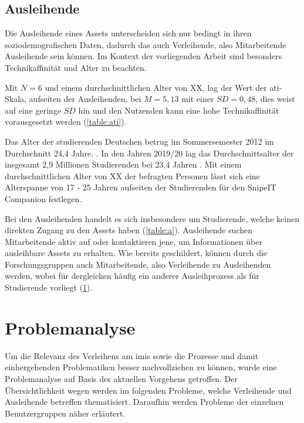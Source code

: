 \subsection{Ausleihende}
Die Ausleihende eines Assets unterscheiden sich nur bedingt in ihren soziodemografischen Daten,
dadurch das auch Verleihende, also Mitarbeitende Ausleihende sein können. Im Kontext der
vorliegenden Arbeit sind besonders Technikaffinität und Alter zu beachten.

Mit $N=6$ und einem durchschnittlichen Alter von XX, lag der Wert der \ac{ati}-Skala, aufseiten der
Ausleihenden, bei $M=5,13$ mit einer $SD=0,48$, dies weist auf eine geringe $SD$ hin und den
Nutzenden kann eine hohe Technikaffinität vorausgesetzt werden  (\ref{table:ati}).

Das Alter der studierenden Deutschen betrug im Sommersemester 2012 im Durchschnitt 24,4
Jahre. \cite{middendorff2017wirtschaftliche}. In den Jahren 2019/20 lag das Durchschnittsalter der
insgesamt 2,9 Millionen Studierenden bei 23,4 Jahren \cite{noauthor_studierende_nodate}. Mit einem
durchschnittlichen Alter von XX der befragten Personen lässt sich eine Alterspanne von 17 - 25
Jahren aufseiten der Studierenden für den SnipeIT Companion festlegen.

Bei den Ausleihenden handelt es sich insbesondere um Studierende, welche keinen direkten Zugang zu
den Assets haben (\ref{table:a}). Ausleihende suchen Mitarbeitende aktiv auf oder kontaktieren jene,
um Informationen über ausleihbare Assets zu erhalten. Wie bereits geschildert, können durch die
Forschungsgruppen auch Mitarbeitende, also Verleihende zu Ausleihenden werden, wobei für dergleichen
häufig ein anderer Ausleihprozess als für Studierende vorliegt (\ref{section:iststand}).


\section{Problemanalyse}
\label{section:iststand}

Um die Relevanz des Verleihens am \ac{imis} sowie die Prozesse und damit einhergehenden
Problematiken besser nachvollziehen zu können, wurde eine Problemanalyse auf Basis des aktuellen
Vorgehens getroffen. Der Übersichtlichkeit wegen werden im folgenden Probleme, welche Verleihende
und Ausleihende betreffen thematisiert. Daraufhin werden Probleme der einzelnen Benutzergruppen
näher erläutert.

